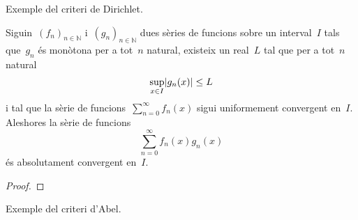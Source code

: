 \documentclass[../../Main.tex]{subfiles}
\begin{document}
	\begin{example}
		Exemple del criteri de Dirichlet.
		\begin{solution}
		\end{solution}
	\end{example}
	\begin{theorem}
		\label{thm:criteri d'Abel}
		Siguin~\((f_{n})_{n\in\mathbb{N}}\) i~\((g_{n})_{n\in\mathbb{N}}\) dues sèries de funcions sobre un interval~\(I\) tals que~\(g_{n}\) és monòtona per a tot~\(n\) natural, existeix un real~\(L\) tal que per a tot~\(n\) natural
		\[
		    \sup_{x\in I}\abs{g_{n}(x)}\leq L
		\]
		i tal que la sèrie de funcions~\(\sum_{n=0}^{\infty}f_{n}(x)\) sigui uniformement convergent en~\(I\).
		Aleshores la sèrie de funcions
		\[
		    \sum_{n=0}^{\infty}f_{n}(x)g_{n}(x)
		\]
		és absolutament convergent en~\(I\).
		\begin{proof}
		\end{proof}
	\end{theorem}
	\begin{example}
		Exemple del criteri d'Abel.
		\begin{solution}
		\end{solution}
	\end{example}
\end{document}
